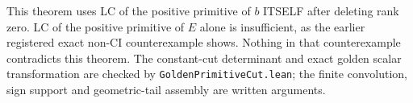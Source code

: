 This theorem uses LC of the positive primitive of $b$ ITSELF after
deleting rank zero. LC of the positive primitive of $E$ alone is
insufficient, as the earlier registered exact non-CI counterexample
shows. Nothing in that counterexample contradicts this theorem.
The constant-cut determinant and exact golden scalar transformation
are checked by \texttt{GoldenPrimitiveCut.lean}; the finite convolution,
sign support and geometric-tail assembly are written arguments.
